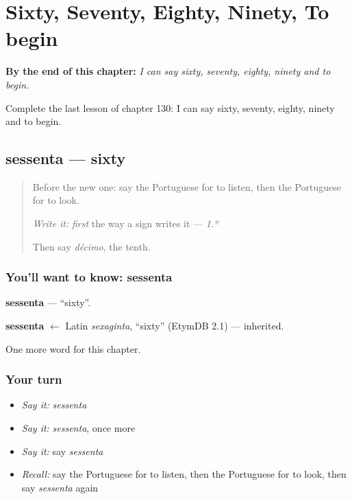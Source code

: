 
\chapter{Sixty, Seventy, Eighty, Ninety, To begin}
\label{ch:pt-sixty-seventy-eighty-ninety-to-begin}

\begin{chapteropening}
\textbf{By the end of this chapter:} \emph{I can say sixty, seventy, eighty, ninety and to begin.}

Complete the last lesson of chapter 130: I can say sixty, seventy, eighty, ninety and to begin.
\end{chapteropening}

\section[sessenta]{sessenta — sixty}

\label{lesson:PT-C130-sessenta}



\begin{quote}
Before the new one: say the Portuguese for to listen, then the Portuguese for to look.

\emph{Write it:} \emph{first} the way a sign writes it — \emph{1.º}

Then say \emph{décimo}, the tenth.
\end{quote}

\subsection*{You'll want to know: sessenta}
\textbf{sessenta} — \textquotedblleft{}sixty\textquotedblright{}.

\begin{cousinweb}
\textbf{sessenta} $\leftarrow$ Latin \emph{sexaginta}, \textquotedblleft{}sixty\textquotedblright{} (EtymDB 2.1) — inherited.
\end{cousinweb}

\begin{grammarlens}[title={What you've built}]
One more word for this chapter.
\end{grammarlens}

\subsection*{Your turn}
\begin{itemize}
\raggedright
  \item \emph{Say it:} \emph{sessenta}
  \item \emph{Say it:} \emph{sessenta}, once more
  \item \emph{Say it:} say \emph{sessenta}
  \item \emph{Recall:} say the Portuguese for to listen, then the Portuguese for to look, then say \emph{sessenta} again
\end{itemize}

